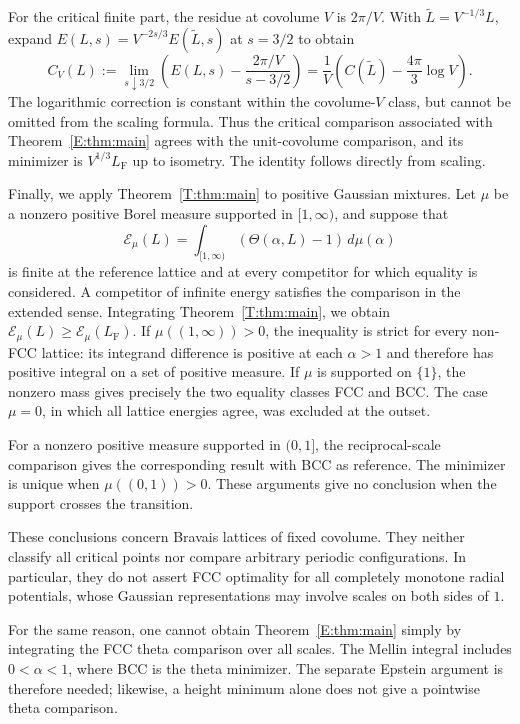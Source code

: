 \documentclass[reqno,english]{amsart}
\theoremstyle{definition}
\newtheorem{open problem}[theorem]{Open Problem}
\theoremstyle{remark}
\theoremstyle{plain}
\numberwithin{equation}{section}
\newcommand{\FCC}{L_{\mathrm F}}
\newcommand{\Th}{\Theta}
\begin{document}
For the critical finite part, the residue at covolume $V$ is
$2\pi/V$. With $\widetilde L=V^{-1/3}L$, expand
$E(L,s)=V^{-2s/3}E(\widetilde L,s)$ at $s=3/2$ to obtain
\begin{equation}\label{eq:finitepart-volume}
 C_V(L):=\lim_{s\downarrow3/2}
 \left(E(L,s)-\frac{2\pi/V}{s-3/2}\right)
 =\frac1V\left(C(\widetilde L)-\frac{4\pi}{3}\log V\right).
\end{equation}
The logarithmic correction is constant within the covolume-$V$
class, but cannot be omitted from the scaling formula. Thus the
critical comparison associated with Theorem~\ref{E:thm:main}
agrees with the unit-covolume comparison, and its minimizer is
$V^{1/3}\FCC$ up to isometry. The identity follows directly from
scaling.

Finally, we apply Theorem~\ref{T:thm:main} to positive Gaussian
mixtures. Let $\mu$ be a nonzero positive Borel measure supported
in $[1,\infty)$, and suppose that
\[
 \mathcal E_\mu(L)=\int_{[1,\infty)}(\Th(\alpha,L)-1)\,d\mu(\alpha)
\]
is finite at the reference lattice and at every competitor for
which equality is considered. A competitor of infinite energy
satisfies the comparison in the extended sense. Integrating
Theorem~\ref{T:thm:main}, we obtain
$\mathcal E_\mu(L)\ge\mathcal E_\mu(\FCC)$.
If $\mu((1,\infty))>0$, the inequality is strict for every non-FCC
lattice: its integrand difference is positive at each $\alpha>1$
and therefore has positive integral on a set of positive measure.
If $\mu$ is supported on $\{1\}$, the nonzero mass gives precisely
the two equality classes FCC and BCC. The case $\mu=0$, in which
all lattice energies agree, was excluded at the outset.

For a nonzero positive measure supported in $(0,1]$, the
reciprocal-scale comparison gives the corresponding result with BCC
as reference. The minimizer is unique when $\mu((0,1))>0$.
These arguments give no conclusion when the support crosses the
transition.


These conclusions concern Bravais lattices of fixed covolume.
They neither classify all critical points nor compare arbitrary
periodic configurations. In particular, they do not assert FCC
optimality for all completely monotone radial potentials, whose
Gaussian representations may involve scales on both sides of $1$.

For the same reason, one cannot obtain
Theorem~\ref{E:thm:main} simply by integrating the FCC theta
comparison over all scales. The Mellin integral includes
$0<\alpha<1$, where BCC is the theta minimizer. The separate
Epstein argument is therefore needed; likewise, a height minimum
alone does not give a pointwise theta comparison.
\end{document}
